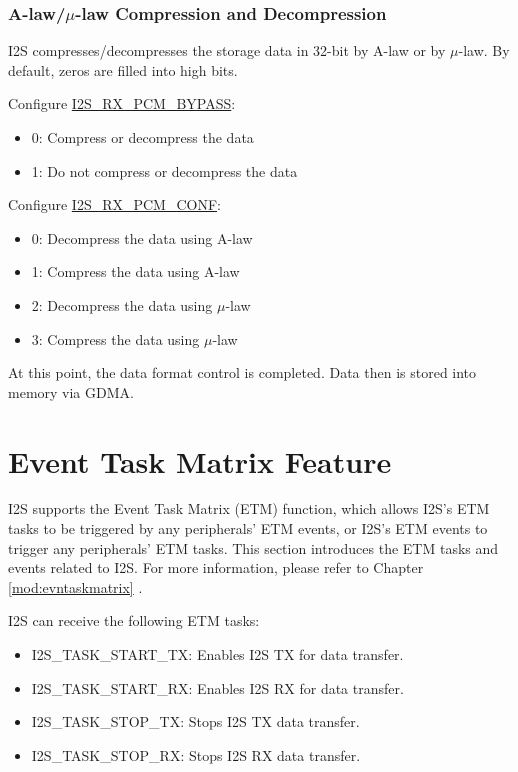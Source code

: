 \documentclass[main\_\_EN.tex]{subfiles}
\begin{document}
\subsubsection{A-law/$\mu$-law Compression and Decompression} 

\chipname{} I2S compresses/decompresses the storage data in 32-bit by A-law or by $\mu$-law. By default, zeros are filled into high bits.

Configure \hyperref[fielddesc:I2SRXPCMBYPASS]{I2S\_RX\_PCM\_BYPASS}:
\begin{itemize}
\item 0: Compress or decompress the data
\item 1: Do not compress or decompress the data
\end{itemize}
Configure \hyperref[fielddesc:I2SRXPCMCONF]{I2S\_RX\_PCM\_CONF}:
\begin{itemize}
\item 0: Decompress the data using A-law
\item 1: Compress the data using A-law
\item 2: Decompress the data using $\mu$-law
\item 3: Compress the data using $\mu$-law
\end{itemize}
At this point, the data format control is completed. Data then is stored into memory via GDMA.

\section{Event Task Matrix Feature}\label{sec:i2s-etm-func}

\chipname{} I2S supports the Event Task Matrix (ETM) function, which allows I2S's ETM tasks to be triggered by any peripherals' ETM events, or I2S's ETM events to trigger any peripherals' ETM tasks. This section introduces the ETM tasks and events related to I2S. For more information, please refer to Chapter \ref{mod:evntaskmatrix} .

I2S can receive the following ETM tasks:

\begin{itemize}
    \item \label{task:I2STASKSTARTTX}I2S\_TASK\_START\_TX: Enables I2S TX for data transfer.
    \item \label{task:I2STASKSTARTRX}I2S\_TASK\_START\_RX: Enables I2S RX for data transfer.
    \item \label{task:I2STASKSTOPTX}I2S\_TASK\_STOP\_TX: Stops I2S TX data transfer.
    \item \label{task:I2STASKSTOPRX}I2S\_TASK\_STOP\_RX: Stops I2S RX data transfer.
\end{itemize}
\end{document}
